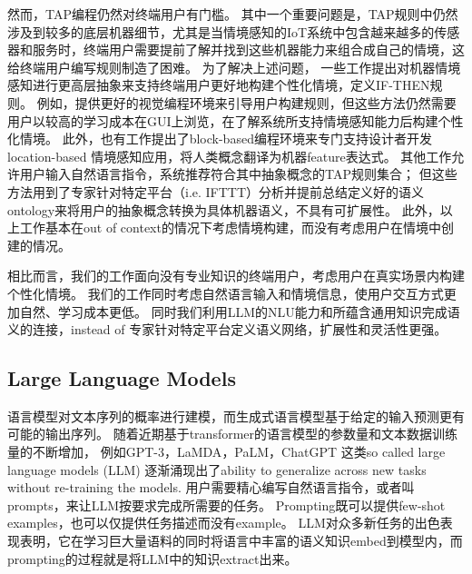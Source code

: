 然而，TAP编程仍然对终端用户有门槛。
其中一个重要问题是，TAP规则中仍然涉及到较多的底层机器细节，尤其是当情境感知的IoT系统中包含越来越多的传感器和服务时，终端用户需要提前了解并找到这些机器能力来组合成自己的情境，这给终端用户编写规则制造了困难\cite{ur_practical_2014,ur_trigger-action_2016,corno_high-level_2019}。
为了解决上述问题， 一些工作提出对机器情境感知进行更高层抽象来支持终端用户更好地构建个性化情境，定义IF-THEN规则。
例如，提供更好的视觉编程环境来引导用户构建规则\cite{ghiani_personalization_2017,desolda_empowering_2017}，但这些方法仍然需要用户以较高的学习成本在GUI上浏览，在了解系统所支持情境感知能力后构建个性化情境。
此外，也有工作\cite{louie_affinder_2022}提出了block-based编程环境来专门支持设计者开发 location-based 情境感知应用，将人类概念翻译为机器feature表达式。
其他工作\cite{corno_high-level_2019,corno_heytap_2020,corno_users_2021}允许用户输入自然语言指令，系统推荐符合其中抽象概念的TAP规则集合；
但这些方法用到了专家针对特定平台（i.e. IFTTT）分析并提前总结定义好的语义ontology来将用户的抽象概念转换为具体机器语义，不具有可扩展性。
此外，以上工作基本在out of context的情况下考虑情境构建，而没有考虑用户在情境中创建的情况。

相比而言，我们的工作面向没有专业知识的终端用户，考虑用户在真实场景内构建个性化情境。
我们的工作同时考虑自然语言输入和情境信息，使用户交互方式更加自然、学习成本更低。
同时我们利用LLM的NLU能力和所蕴含通用知识完成语义的连接，instead of 专家针对特定平台定义语义网络，扩展性和灵活性更强。


\subsection{Large Language Models}




语言模型对文本序列的概率进行建模，而生成式语言模型基于给定的输入预测更有可能的输出序列。
随着近期基于transformer的语言模型\cite{vaswani_attention_2017}的参数量和文本数据训练量的不断增加，
例如GPT-3\cite{brown_language_2020}，LaMDA\cite{thoppilan_lamda_2022}，PaLM\cite{chowdhery_palm_2022}，ChatGPT\cite{openai_introducing_2022} 这类so called large language models (LLM) 逐渐涌现出了ability to generalize across new tasks without re-training the models.
用户需要精心编写自然语言指令，或者叫prompts，来让LLM按要求完成所需要的任务。
Prompting既可以提供few-shot examples，也可以仅提供任务描述而没有example。
LLM对众多新任务的出色表现表明，它在学习巨大量语料的同时将语言中丰富的语义知识embed到模型内，而prompting的过程就是将LLM中的知识extract出来。

